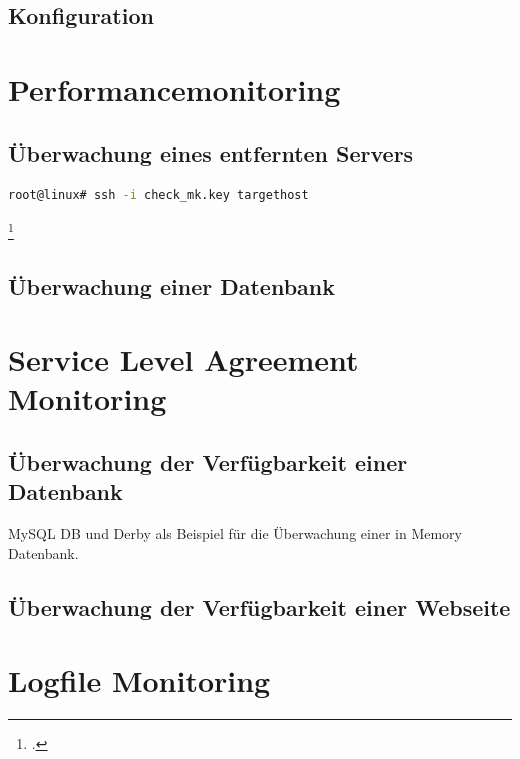 \documentclass[12pt,a4paper,parskip]{scrreprt}
\begin{document}
	\subsection{Konfiguration}
	
	\section{Performancemonitoring}
	\subsection{Überwachung eines entfernten Servers}
	\begin{lstlisting}[language=bash]
	root@linux# ssh -i check_mk.key targethost
	\end{lstlisting} \footcite{checkmkCheckBySSH2015}
	\subsection{Überwachung einer Datenbank}
	\section{Service Level Agreement Monitoring}
	\subsection{Überwachung der Verfügbarkeit einer Datenbank}
	MySQL DB und Derby als Beispiel für die Überwachung einer in Memory Datenbank.
	\subsection{Überwachung der Verfügbarkeit einer Webseite}
	\section{Logfile Monitoring}
	
	\begingroup
	\nocite{*} %
	\printbibliography 
	\endgroup
	\printglossary[title=Abkürzungsverzeichnis, type=\acronymtype] %
	\printglossary[title=Glossar]
	\listoffigures %
	\listoftables %
\end{document}
